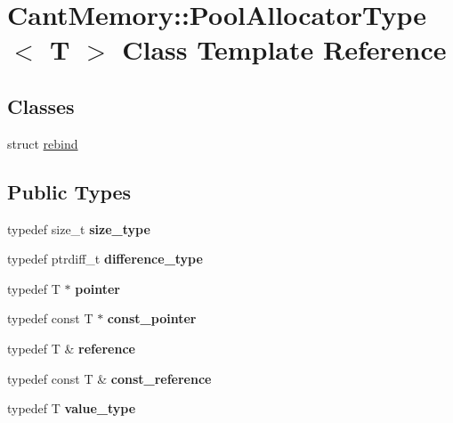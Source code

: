 \hypertarget{classCantMemory_1_1PoolAllocatorType}{}\section{Cant\+Memory\+:\+:Pool\+Allocator\+Type$<$ T $>$ Class Template Reference}
\label{classCantMemory_1_1PoolAllocatorType}
\subsection*{Classes}
\begin{DoxyCompactItemize}
\item 
struct \hyperlink{structCantMemory_1_1PoolAllocatorType_1_1rebind}{rebind}
\end{DoxyCompactItemize}
\subsection*{Public Types}
\begin{DoxyCompactItemize}
\item 
\mbox{\label{classCantMemory_1_1PoolAllocatorType_a2fca89ed5b9f11f357e05947b59f6374}} 
typedef size\+\_\+t {\bfseries size\+\_\+type}
\item 
\mbox{\label{classCantMemory_1_1PoolAllocatorType_a8d5ac515cd39942b244c1bd98195b079}} 
typedef ptrdiff\+\_\+t {\bfseries difference\+\_\+type}
\item 
\mbox{\label{classCantMemory_1_1PoolAllocatorType_aa0ea1542c3f28df46d70ab764e6a0828}} 
typedef T $\ast$ {\bfseries pointer}
\item 
\mbox{\label{classCantMemory_1_1PoolAllocatorType_af972a11887913a449ad30e0d07984c09}} 
typedef const T $\ast$ {\bfseries const\+\_\+pointer}
\item 
\mbox{\label{classCantMemory_1_1PoolAllocatorType_a85a15198deb2805e5532e630ec6ec447}} 
typedef T \& {\bfseries reference}
\item 
\mbox{\label{classCantMemory_1_1PoolAllocatorType_a4e06116c8efbadca7b5812e22d915232}} 
typedef const T \& {\bfseries const\+\_\+reference}
\item 
\mbox{\label{classCantMemory_1_1PoolAllocatorType_af5e29f860104304e7c58d16b5b10ad78}} 
typedef T {\bfseries value\+\_\+type}
\end{DoxyCompactItemize}

